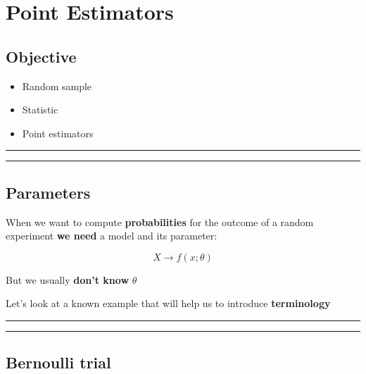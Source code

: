 \documentclass[
]{book}
\providecommand{\tightlist}{%
  \setlength{\itemsep}{0pt}\setlength{\parskip}{0pt}}
\begin{document}
\hypertarget{point-estimators}{%
\chapter{Point Estimators}\label{point-estimators}}

\hypertarget{objective-9}{%
\section{Objective}\label{objective-9}}

\begin{itemize}
\tightlist
\item
  Random sample
\item
  Statistic
\item
  Point estimators
\end{itemize}

\begin{center}\rule{0.5\linewidth}{0.5pt}\end{center}

\begin{center}\rule{0.5\linewidth}{0.5pt}\end{center}

\hypertarget{parameters}{%
\section{Parameters}\label{parameters}}

When we want to compute \textbf{probabilities} for the outcome of a random experiment \textbf{we need} a model and its parameter:

\[X \rightarrow f(x; \theta)\]

But we usually \textbf{don't know} \(\theta\)

Let's look at a known example that will help us to introduce \textbf{terminology}

\begin{center}\rule{0.5\linewidth}{0.5pt}\end{center}

\begin{center}\rule{0.5\linewidth}{0.5pt}\end{center}

\hypertarget{bernoulli-trial-4}{%
\section{Bernoulli trial}\label{bernoulli-trial-4}}
\end{document}
